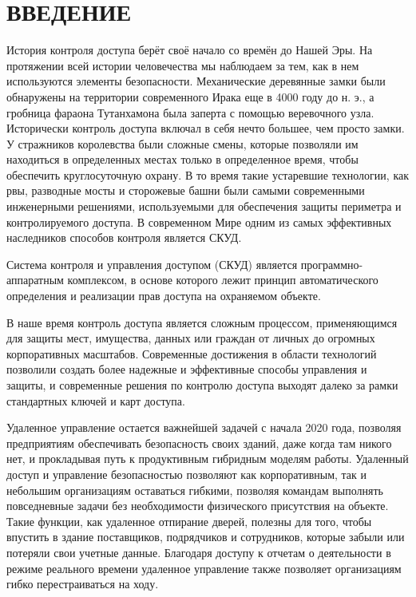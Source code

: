 \section*{ВВЕДЕНИЕ}

История контроля доступа берёт своё начало со времён до Нашей Эры. На протяжении всей истории человечества мы наблюдаем за тем, как в нем используются элементы безопасности. Механические деревянные замки были обнаружены на территории современного Ирака еще в 4000 году до н. э., а гробница фараона Тутанхамона была заперта с помощью веревочного узла. Исторически контроль доступа включал в себя нечто большее, чем просто замки. У стражников королевства были сложные смены, которые позволяли им находиться в определенных местах только в определенное время, чтобы обеспечить круглосуточную охрану. В то время такие устаревшие технологии, как рвы, разводные мосты и сторожевые башни были самыми современными инженерными решениями, используемыми для обеспечения защиты периметра и контролируемого доступа. В современном Мире одним из самых эффективных наследников способов контроля является СКУД.

Система контроля и управления доступом (СКУД) является программно-аппаратным комплексом, в основе которого лежит принцип автоматического определения и реализации прав доступа на охраняемом объекте.

В наше время контроль доступа является сложным процессом, применяющимся для защиты мест, имущества, данных или граждан от личных до огромных корпоративных масштабов.  Современные достижения в области технологий позволили создать более надежные и эффективные способы управления и защиты, и современные решения по контролю доступа выходят далеко за рамки стандартных ключей и карт доступа. 

Удаленное управление остается важнейшей задачей с начала 2020 года, позволяя предприятиям обеспечивать безопасность своих зданий, даже когда там никого нет, и прокладывая путь к продуктивным гибридным моделям работы. Удаленный доступ и управление безопасностью позволяют как корпоративным, так и небольшим организациям оставаться гибкими, позволяя командам выполнять повседневные задачи без необходимости физического присутствия на объекте. Такие функции, как удаленное отпирание дверей, полезны для того, чтобы впустить в здание поставщиков, подрядчиков и сотрудников, которые забыли или потеряли свои учетные данные. Благодаря доступу к отчетам о деятельности в режиме реального времени удаленное управление также позволяет организациям гибко перестраиваться на ходу. 

